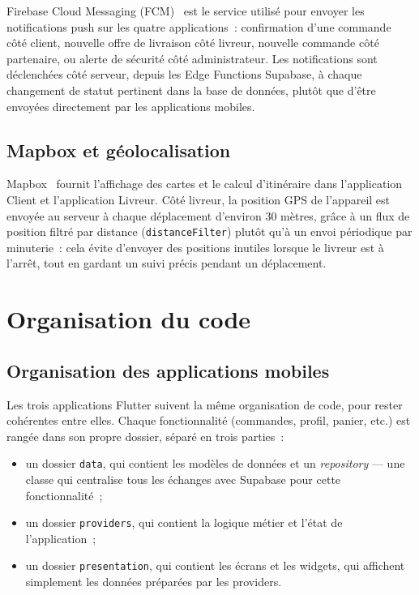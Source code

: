 \documentclass[12pt,fleqn,a4paper]{report}
\begin{document}
\begin{justify}
Firebase Cloud Messaging (FCM)~\cite{fcm_docs} est le service utilisé pour envoyer les notifications push sur les quatre applications~: confirmation d'une commande côté client, nouvelle offre de livraison côté livreur, nouvelle commande côté partenaire, ou alerte de sécurité côté administrateur. Les notifications sont déclenchées côté serveur, depuis les Edge Functions Supabase, à chaque changement de statut pertinent dans la base de données, plutôt que d'être envoyées directement par les applications mobiles.

\subsection{Mapbox et géolocalisation}

Mapbox~\cite{mapbox_docs} fournit l'affichage des cartes et le calcul d'itinéraire dans l'application Client et l'application Livreur. Côté livreur, la position GPS de l'appareil est envoyée au serveur à chaque déplacement d'environ 30 mètres, grâce à un flux de position filtré par distance (\texttt{distanceFilter}) plutôt qu'à un envoi périodique par minuterie~: cela évite d'envoyer des positions inutiles lorsque le livreur est à l'arrêt, tout en gardant un suivi précis pendant un déplacement.

\section{Organisation du code}

\subsection{Organisation des applications mobiles}

Les trois applications Flutter suivent la même organisation de code, pour rester cohérentes entre elles. Chaque fonctionnalité (commandes, profil, panier, etc.) est rangée dans son propre dossier, séparé en trois parties~:

\begin{itemize}
    \item un dossier \texttt{data}, qui contient les modèles de données et un \emph{repository} — une classe qui centralise tous les échanges avec Supabase pour cette fonctionnalité~;
    \item un dossier \texttt{providers}, qui contient la logique métier et l'état de l'application~;
    \item un dossier \texttt{presentation}, qui contient les écrans et les widgets, qui affichent simplement les données préparées par les providers.
\end{itemize}


\end{justify}
\end{document}
